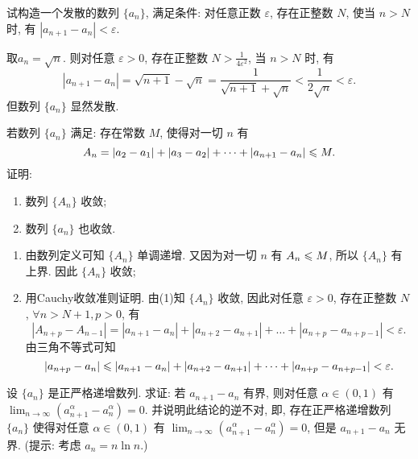 \begin{exercise}[1.C.4]
    试构造一个发散的数列 $\{a_n\}$, 满足条件: 对任意正数 $\varepsilon$, 存在正整数 $N$, 使当 $n > N$ 时, 有 $|a_{n+1}-a_n| < \varepsilon$.
\end{exercise}

\begin{solution}
    取$a_n = \sqrt{n}$. 则对任意 $\varepsilon > 0$, 存在正整数 $N > \frac{1}{4\varepsilon^2}$, 当 $n > N$ 时, 有
    $$ |a_{n+1}-a_n| = \sqrt{n+1} - \sqrt{n} = \frac{1}{\sqrt{n+1} + \sqrt{n}} < \frac{1}{2\sqrt{n}} < \varepsilon. $$
    但数列 $\{a_n\}$ 显然发散.
\end{solution}

\begin{exercise}[1.C.5]
    若数列 $\{a_n\}$ 满足: 存在常数 $M$, 使得对一切 $n$ 有
    $$ A_n = |a_2-a_1| + |a_3-a_2| + \dots + |a_{n+1}-a_n| \leqslant M. $$
    证明:
    \begin{enumerate}
        \item 数列 $\{A_n\}$ 收敛;
        \item 数列 $\{a_n\}$ 也收敛.
    \end{enumerate}
\end{exercise}

\begin{solution}
    \begin{enumerate}[(1)]
        \item 由数列定义可知 $\{A_n\}$ 单调递增. 又因为对一切 $n$ 有 $A_n \leqslant M$, 所以 $\{A_n\}$ 有上界. 因此 $\{A_n\}$ 收敛;
        \item 用Cauchy收敛准则证明. 由(1)知 $\{A_n\}$ 收敛, 因此对任意 $\varepsilon > 0$, 存在正整数 $N$, $\forall n > N+1, p > 0$, 有
              $$ |A_{n+p} - A_{n-1}| = |a_{n+1}-a_n| + |a_{n+2}-a_{n+1}| + \dots + |a_{n+p}-a_{n+p-1}| < \varepsilon. $$
                由三角不等式可知
                $$ |a_{n+p} - a_n| \leqslant |a_{n+1}-a_n| + |a_{n+2}-a_{n+1}| + \dots + |a_{n+p}-a_{n+p-1}| < \varepsilon. $$
    \end{enumerate}
\end{solution}

\begin{exercise}[1.C.6]
    设 $\{a_n\}$ 是正严格递增数列. 求证: 若 $a_{n+1}-a_n$ 有界, 则对任意 $\alpha \in (0,1)$ 有 $\lim_{n \to \infty} (a_{n+1}^\alpha - a_n^\alpha) = 0$. 并说明此结论的逆不对, 即, 存在正严格递增数列 $\{a_n\}$ 使得对任意 $\alpha \in (0,1)$ 有 $\lim_{n \to \infty} (a_{n+1}^\alpha - a_n^\alpha) = 0$, 但是 $a_{n+1}-a_n$ 无界. (提示: 考虑 $a_n = n\ln n$.)
\end{exercise}

